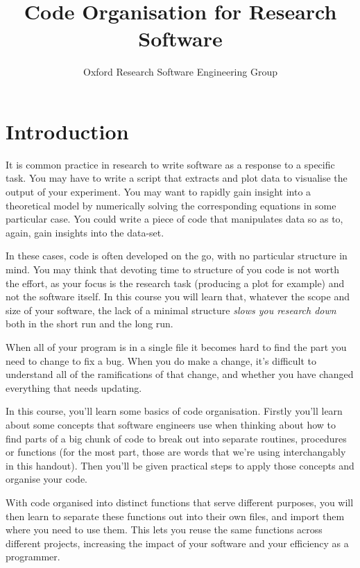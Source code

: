 \documentclass[a4paper]{article}
\begin{document}
\title{Code Organisation for Research Software}
\author{Oxford Research Software Engineering Group}
\maketitle

\section{Introduction}
It is common practice in research to write software as a response to a specific task.
You may have to write a script that extracts and plot data to visualise the output of your experiment.
You may want to rapidly gain insight into a theoretical model by numerically solving the corresponding equations in some particular case.
You could write a piece of code that manipulates data so as to, again, gain insights into the data-set.

In these cases, code is often developed on the go, with no particular structure in mind.
You may think that devoting time to structure of you code is not worth the effort, as your focus is the research task (producing a plot for example) and not the software itself.
In this course you will learn that, whatever the scope and size of your software, the lack of a minimal structure \textit{slows you research down} both in the short run and the long run.

When all of your program is in a single file it becomes hard to find the part you need to change to fix a bug.
When you do make a change, it's difficult to understand all of the ramifications of that change, and whether you have changed everything that needs updating.

In this course, you'll learn some basics of code organisation.
Firstly you'll learn about some concepts that software engineers use when thinking about how to find parts of a big chunk of code to break out into separate routines, procedures or functions (for the most part, those are words that we're using interchangably in this handout).
Then you'll be given practical steps to apply those concepts and organise your code.

With code organised into distinct functions that serve different purposes, you will then learn to separate these functions out into their own files, and import them where you need to use them.
This lets you reuse the same functions across different projects, increasing the impact of your software and your efficiency as a programmer.
\end{document}
